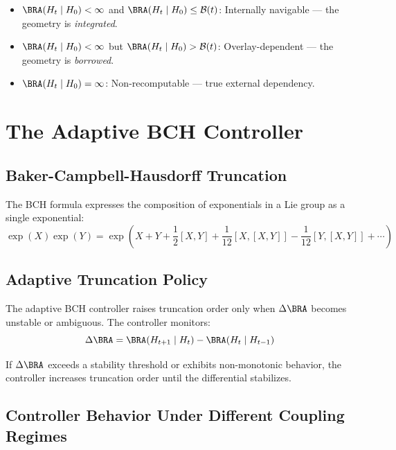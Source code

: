\documentclass[12pt]{article}
\theoremstyle{plain}
\theoremstyle{definition}
\theoremstyle{remark}
\begin{document}
\begin{itemize}
    \item $\BRA(H_t \mid H_0) < \infty$ and $\BRA(H_t \mid H_0) \le \mathcal{B}(t)$: Internally navigable — the geometry is \emph{integrated}.
    \item $\BRA(H_t \mid H_0) < \infty$ but $\BRA(H_t \mid H_0) > \mathcal{B}(t)$: Overlay-dependent — the geometry is \emph{borrowed}.
    \item $\BRA(H_t \mid H_0) = \infty$: Non-recomputable — true external dependency.
\end{itemize}


\section{The Adaptive BCH Controller}

\subsection{Baker-Campbell-Hausdorff Truncation}

The BCH formula expresses the composition of exponentials in a Lie group as a single exponential:
\[
\exp(X)\exp(Y) = \exp\left(X + Y + \frac{1}{2}[X,Y] + \frac{1}{12}[X,[X,Y]] - \frac{1}{12}[Y,[X,Y]] + \cdots\right)
\]

\subsection{Adaptive Truncation Policy}

The adaptive BCH controller raises truncation order only when $\Delta \BRA$ becomes unstable or ambiguous. The controller monitors:
\[
\Delta \BRA = \BRA(H_{t+1} \mid H_t) - \BRA(H_t \mid H_{t-1})
\]

If $\Delta \BRA$ exceeds a stability threshold or exhibits non-monotonic behavior, the controller increases truncation order until the differential stabilizes.


\subsection{Controller Behavior Under Different Coupling Regimes}
\end{document}
